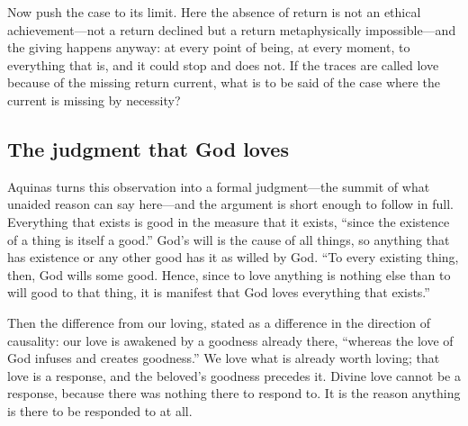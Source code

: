 Now push the case to its limit. Here the absence of return is not an ethical achievement---not a return declined but a return metaphysically impossible---and the giving happens anyway: at every point of being, at every moment, to everything that is, and it could stop and does not. If the traces are called love because of the missing return current, what is to be said of the case where the current is missing by necessity?

\subsection{The judgment that God loves}

Aquinas turns this observation into a formal judgment---the summit of what unaided reason can say here---and the argument is short enough to follow in full. Everything that exists is good in the measure that it exists, ``since the existence of a thing is itself a good.'' God's will is the cause of all things, so anything that has existence or any other good has it as willed by God. ``To every existing thing, then, God wills some good. Hence, since to love anything is nothing else than to will good to that thing, it is manifest that God loves everything that exists.''

Then the difference from our loving, stated as a difference in the direction of causality: our love is awakened by a goodness already there, ``whereas the love of God infuses and creates goodness.'' We love what is already worth loving; that love is a response, and the beloved's goodness precedes it. Divine love cannot be a response, because there was nothing there to respond to. It is the reason anything is there to be responded to at all.

